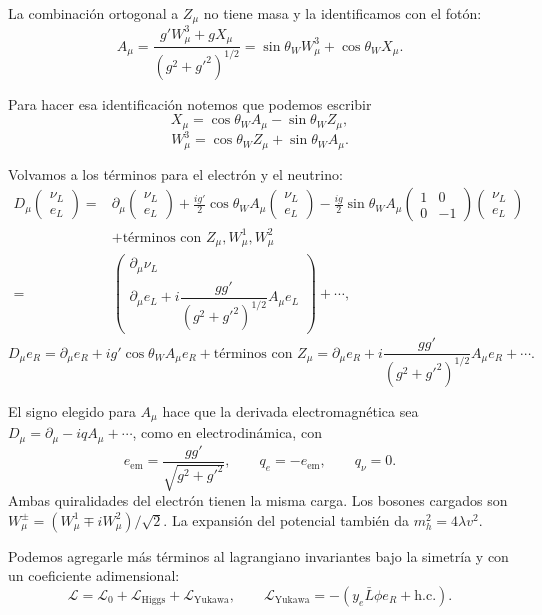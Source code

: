 \documentclass[11pt,a4paper]{article}
\newcommand{\hc}{\mathrm{h.c.}}
\begin{document}
La combinación ortogonal a $Z_\mu$ no tiene masa y la identificamos con el
fotón:
\[
  A_\mu
  =\frac{g'W_\mu^3+gX_\mu}{(g^2+g'^2)^{1/2}}
  =\sin\theta_WW_\mu^3+\cos\theta_WX_\mu.
\]

Para hacer esa identificación notemos que podemos escribir
\[
  X_\mu=\cos\theta_WA_\mu-\sin\theta_WZ_\mu,
\]
\[
  W_\mu^3=\cos\theta_WZ_\mu+\sin\theta_WA_\mu.
\]

Volvamos a los términos para el electrón y el neutrino:
\begin{align*}
  D_\mu
  \begin{pmatrix}\nu_L\\e_L\end{pmatrix}
  ={}&\partial_\mu
  \begin{pmatrix}\nu_L\\e_L\end{pmatrix}
  +\frac{ig'}2\cos\theta_WA_\mu
  \begin{pmatrix}\nu_L\\e_L\end{pmatrix}
  -\frac{ig}2\sin\theta_WA_\mu
  \begin{pmatrix}1&0\\0&-1\end{pmatrix}
  \begin{pmatrix}\nu_L\\e_L\end{pmatrix}\\
  &+\text{términos con }Z_\mu,W_\mu^1,W_\mu^2\\
  ={}&
  \begin{pmatrix}
    \partial_\mu\nu_L\\[1mm]
    \partial_\mu e_L+
    i\dfrac{gg'}{(g^2+g'^2)^{1/2}}A_\mu e_L
  \end{pmatrix}
  +\cdots,
\end{align*}
\[
  D_\mu e_R
  =\partial_\mu e_R+ig'\cos\theta_WA_\mu e_R
   +\text{términos con }Z_\mu
  =\partial_\mu e_R+i\frac{gg'}{(g^2+g'^2)^{1/2}}A_\mu e_R+\cdots.
\]

El signo elegido para $A_\mu$ hace que la derivada electromagnética sea
$D_\mu=\partial_\mu-iqA_\mu+\cdots$, como en electrodinámica, con
\[
  e_{\mathrm{em}}=\frac{gg'}{\sqrt{g^2+g'^2}},
  \qquad q_e=-e_{\mathrm{em}},\qquad q_\nu=0.
\]
Ambas quiralidades del electrón tienen la misma carga.
Los bosones cargados son
$W^\pm_\mu=(W^1_\mu\mp iW^2_\mu)/\sqrt2$.
La expansión del potencial también da $m_h^2=4\lambda v^2$.

Podemos agregarle más términos al lagrangiano invariantes bajo la simetría y con
un coeficiente adimensional:
\[
  \mathcal L
  =\mathcal L_0+\mathcal L_{\mathrm{Higgs}}+\mathcal L_{\mathrm{Yukawa}},
  \qquad
  \mathcal L_{\mathrm{Yukawa}}
  =-\left(y_e\bar L\phi e_R+\hc\right).
\]
\end{document}
